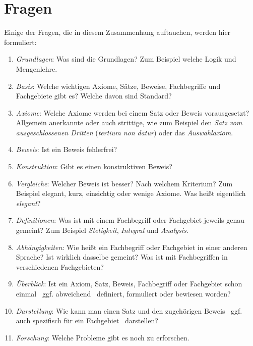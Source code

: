 \documentclass[english,ngerman,parskip=half,headsepline,footsepline]{scrreprt}
\begin{document}
	\section{Fragen} %
	\label{sec:Fragen}
	Einige der Fragen, die in diesem Zusammenhang auftauchen, werden hier formuliert:

	\begin{enumerate}

		\item \label{Frage:Grundlagen} \emph{Grundlagen}: Was sind die Grundlagen? Zum Beispiel welche Logik und Mengenlehre.

		\item \label{Frage:Basis} \emph{Basis}: Welche wichtigen Axiome, Sätze, Beweise, Fachbegriffe und Fachgebiete gibt es? Welche davon sind Standard?

		\item \label{Frage:Axiome} \emph{Axiome}: Welche Axiome werden bei einem Satz oder Beweis vorausgesetzt? Allgemein anerkannte oder auch strittige, wie zum Beispiel den \emph{Satz vom ausgeschlossenen Dritten} (\emph{tertium non datur}) oder das \emph{Auswahlaxiom}.

		\item \label{Frage:Beweis} \emph{Beweis}: Ist ein Beweis fehlerfrei?

		\item \label{Frage:Konstruktion} \emph{Konstruktion}: Gibt es einen konstruktiven Beweis?

		\item \label{Frage:Vergleiche} \emph{Vergleiche}: Welcher Beweis ist besser? Nach welchem Kriterium? Zum Beispiel elegant, kurz, einsichtig oder wenige Axiome. Was heißt eigentlich \emph{elegant}?

		\item \label{Frage:Definitionen} \emph{Definitionen}: Was ist mit einem Fachbegriff oder Fachgebiet jeweils genau gemeint? Zum Beispiel \emph{Stetigkeit}, \emph{Integral} und \emph{Analysis}.

		\item \label{Frage:Abhängigkeiten} \emph{Abhängigkeiten}: Wie heißt ein Fachbegriff oder Fachgebiet in einer anderen Sprache? Ist wirklich dasselbe gemeint? Was ist mit Fachbegriffen in verschiedenen Fachgebieten?

		\item \label{Frage:Überblick} \emph{Überblick}: Ist ein Axiom, Satz, Beweis, Fachbegriff oder Fachgebiet schon einmal \textendash\ ggf. abweichend \textendash\ definiert, formuliert oder bewiesen worden?

		\item \label{Frage:Darstellung} \emph{Darstellung}: Wie kann man einen Satz und den zugehörigen Beweis \textendash\ ggf. auch spezifisch für ein Fachgebiet \textendash\ darstellen?

		\item \label{Frage:Forschung} \emph{Forschung}: Welche Probleme gibt es noch zu erforschen.

	\end{enumerate}
\end{document}
